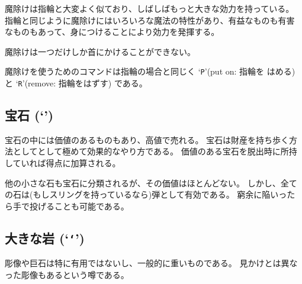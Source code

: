 魔除けは指輪と大変よく似ており、しばしばもっと大きな効力を持っている。
指輪と同じように魔除けにはいろいろな魔法の特性があり、有益なものも有害
なものもあって、身につけることにより効力を発揮する。

魔除けは一つだけしか首にかけることができない。

魔除けを使うためのコマンドは指輪の場合と同じく `{\tt P}'(put on: 指輪を
はめる) と `{\tt R}'(remove: 指輪をはずす) である。

\subsection*{宝石 (`{\tt *}')}

宝石の中には価値のあるものもあり、高値で売れる。
宝石は財産を持ち歩く方法としてとして極めて効果的なやり方である。
価値のある宝石を脱出時に所持していれば得点に加算される。

他の小さな石も宝石に分類されるが、その価値はほとんどない。
しかし、全ての石は(もしスリングを持っているなら)弾として有効である。
窮余に陥いったら手で投げることも可能である。

\subsection*{大きな岩 (`{\tt `}')}
彫像や巨石は特に有用ではないし、一般的に重いものである。
見かけとは異なった彫像もあるという噂である。

